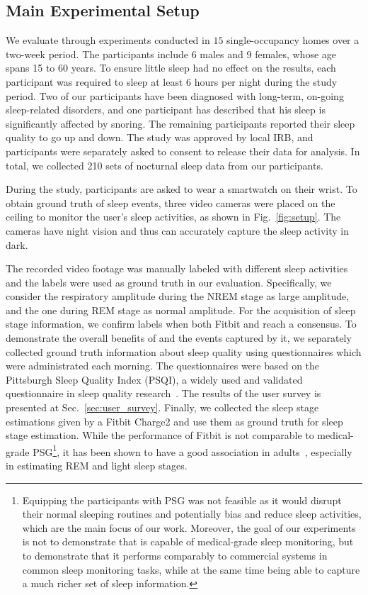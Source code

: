 \subsection{Main Experimental Setup\label{sec:evalusers}}

 We evaluate {\systemname} through experiments conducted in $15$ single-occupancy homes over a two-week period.
The participants include 6 males and 9 females, whose age spans 15 to 60 years. To ensure little sleep had no effect on the results, each
participant was required to sleep at least $6$ hours per night during the study period. Two of our participants have been diagnosed with
long-term, on-going sleep-related disorders, and one participant has described that his sleep is significantly affected by snoring. The
remaining participants reported their sleep quality to go up and down. The study was approved by local IRB, and participants were
separately asked to consent to release their data for analysis. In total, we collected 210 sets of nocturnal sleep data from our
participants.

 During the study, participants are asked to wear a smartwatch on their wrist. To obtain ground truth of sleep events,
three video cameras were placed on the ceiling to monitor the user's sleep activities, as shown in Fig.~\ref{fig:setup}. The cameras have
night vision and thus can accurately capture the sleep activity in dark.


 The recorded video footage was manually labeled with different sleep activities and the labels
were used as ground truth in our evaluation. Specifically, we consider the respiratory amplitude during the NREM stage as large amplitude,
and the one during REM stage as normal amplitude. For the acquisition of sleep stage information, we confirm labels when both Fitbit and
{\systemname} reach a consensus. To demonstrate the overall benefits of {\systemname} and the events captured by it, we separately
collected ground truth information about sleep quality using questionnaires which were administrated each morning. The questionnaires were
based on the Pittsburgh Sleep Quality Index (PSQI), a widely used and validated questionnaire in sleep quality
research~\cite{buysse1989pittsburgh}. The results of the user survey is presented at Sec.~\ref{sec:user_survey}. Finally, we collected the
sleep stage estimations given by a Fitbit Charge2 and use them as ground truth for sleep stage estimation. While the performance of Fitbit
is not comparable to medical-grade PSG\footnote{Equipping the participants with PSG was not feasible as it would disrupt their normal
sleeping routines and potentially bias and reduce sleep activities, which are the main focus of our work. Moreover, the goal of our
experiments is not to demonstrate that {\systemname} is capable of medical-grade sleep monitoring, but to demonstrate that it performs
comparably to commercial systems in common sleep monitoring tasks, while at the same time being able to capture a much richer set of sleep
information.}, it has been shown to have a good association in adults~\cite{evenson2015systematic,fitbit01,fitbit02,fitbit03}, especially
in estimating REM and light sleep stages.


